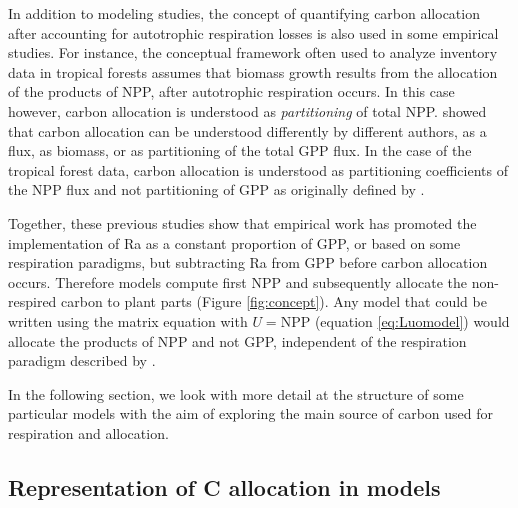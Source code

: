 \documentclass[12pt, a4paper]{article}
\begin{document}
In addition to modeling studies, the concept of quantifying carbon allocation after accounting for autotrophic respiration losses is also used in some empirical studies. For instance, the conceptual framework often used to analyze inventory data in tropical forests \citep[e.g.][]{Malhi2011, Malhi2015} assumes that biomass growth results from the allocation of the products of NPP, after autotrophic respiration occurs. In this case however, carbon allocation is understood as \emph{partitioning} of total NPP. \citet{Litton2007} showed that carbon allocation can be understood differently by different authors, as a flux, as biomass, or as partitioning of the total GPP flux. In the case of the tropical forest data, carbon allocation is understood as partitioning coefficients of the NPP flux and not partitioning of GPP as originally defined by \citet{Litton2007}.  

Together, these previous studies show that empirical work has promoted the implementation of Ra as a constant proportion of GPP, or based on some respiration paradigms, but subtracting Ra from GPP before carbon allocation occurs. Therefore models compute first NPP and subsequently allocate the non-respired carbon to plant parts (Figure \ref{fig:concept}). Any model that could be written using the matrix equation with $U = \mathrm{NPP}$ (equation \ref{eq:Luomodel}) would allocate the products of NPP and not GPP, independent of the respiration paradigm described by \citet{Amthor2000}. 

In the following section, we look with more detail at the structure of some particular models with the aim of exploring the main source of carbon used for respiration and allocation.


\subsection{Representation of C allocation in models} 
\end{document}
